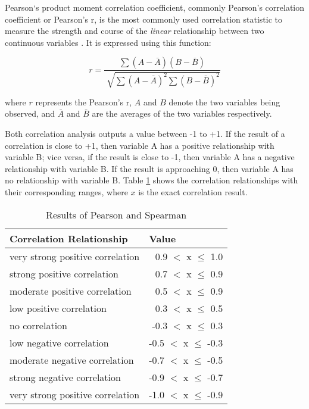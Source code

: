 Pearson`s product moment correlation coefficient, commonly Pearson’s correlation coefficient or Pearson’s r, is the most commonly used correlation statistic to measure the strength and course of the \textit{linear} relationship between two continuous variables . It is expressed using this function:

\begin {equation}
r = \frac{\sum (A - \bar{A})(B - \bar{B})}{\sqrt[]{\sum (A - \bar{A})^2 \sum(B - \bar{B})^2}}
\end{equation}

\noindent where $r$ represents the Pearson’s r, $A$ and $B$ denote the two variables being observed, and $\bar{A}$ and $\bar{B}$ are the averages of the two variables respectively. 

Both correlation analysis outputs a value between -1 to +1. If the result of a correlation is close to +1, then variable A has a positive relationship with variable B; vice versa, if the result is close to -1, then variable A has a negative relationship with variable B. If the result is approaching 0, then variable A has no relationship with variable B. Table \ref{table:correlation-results} shows the correlation relationships with their corresponding ranges, where $x$ is the exact correlation result. 


\begin{table}[h]
\centering
\caption{Results of Pearson and Spearman}
\label{table:correlation-results}
\begin{tabular}{|l|r|}
\hline
Correlation Relationship         & \multicolumn{1}{l|}{Value}        \\ \hline
very strong positive correlation & 0.9 $<$ x $\leq$ 1.0   \\ \hline
strong positive correlation      & 0.7 $<$ x $\leq$ 0.9   \\ \hline
moderate positive correlation    & 0.5 $<$ x $\leq$ 0.9   \\ \hline
low positive correlation         & 0.3 $<$ x $\leq$ 0.5   \\ \hline
no correlation                   & -0.3 $<$ x $\leq$ 0.3  \\ \hline
low negative correlation         & -0.5 $<$ x $\leq$ -0.3 \\ \hline
moderate negative correlation    & -0.7 $<$ x $\leq$ -0.5 \\ \hline
strong negative correlation      & -0.9 $<$ x $\leq$ -0.7 \\ \hline
very strong positive correlation & -1.0 $<$ x $\leq$ -0.9 \\ \hline
\end{tabular}
\end{table}

